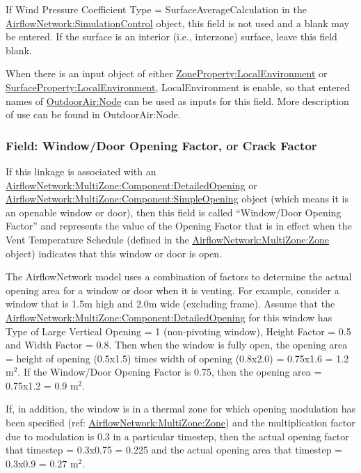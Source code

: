 If Wind Pressure Coefficient Type = SurfaceAverageCalculation in the \hyperref[airflownetworksimulationcontrol]{AirflowNetwork:\hyperref[simulationcontrol]{SimulationControl}}
object, this field is not used and a blank may be entered. If the surface is an
interior (i.e., interzone) surface, leave this field blank.

When there is an input object of either \hyperref[ZonePropertylocalEnvironment]{ZoneProperty:LocalEnvironment} or \hyperref[surfacePropertylocalEnvironment]{SurfaceProperty:LocalEnvironment}, LocalEnvironment is enable, so that entered names of \hyperref[outdoorairnode]{OutdoorAir:Node} can be used as inputs for this field. More description of use can be found in  OutdoorAir:Node.

\subsubsection{Field: Window/Door Opening Factor, or Crack Factor}\label{field-windowdoor-opening-factor-or-crack-factor}

If this linkage is associated with an \hyperref[airflownetworkmultizonecomponentdetailedopening]{AirflowNetwork:MultiZone:Component:DetailedOpening} or \hyperref[airflownetworkmultizonecomponentsimpleopening]{AirflowNetwork:MultiZone:Component:SimpleOpening} object (which means it is an openable window or door), then this field is called ``Window/Door Opening Factor'' and represents the value of the Opening Factor that is in effect when the Vent Temperature Schedule (defined in the \hyperref[airflownetworkmultizonezone]{AirflowNetwork:MultiZone:Zone} object) indicates that this window or door is open.

The AirflowNetwork model uses a combination of factors to determine the actual opening area for a window or door when it is venting. For example, consider a window that is 1.5m high and 2.0m wide (excluding frame). Assume that the \hyperref[airflownetworkmultizonecomponentdetailedopening]{AirflowNetwork:MultiZone:Component:DetailedOpening} for this window has Type of Large Vertical Opening = 1 (non-pivoting window), Height Factor = 0.5 and Width Factor = 0.8. Then when the window is fully open, the opening area = height of opening (0.5x1.5) times width of opening (0.8x2.0) = 0.75x1.6 = 1.2 m\(^{2}\). If the Window/Door Opening Factor is 0.75, then the opening area = 0.75x1.2 = 0.9 m\(^{2}\).

If, in addition, the window is in a thermal zone for which opening modulation has been specified (ref: \hyperref[airflownetworkmultizonezone]{AirflowNetwork:MultiZone:Zone}) and the multiplication factor due to modulation is 0.3 in a particular timestep, then the actual opening factor that timestep = 0.3x0.75 = 0.225 and the actual opening area that timestep = 0.3x0.9 = 0.27 m\(^{2}\).

